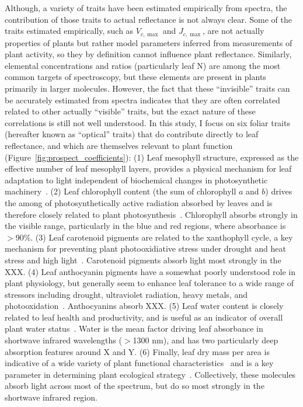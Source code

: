 Although, a variety of traits have been estimated empirically from spectra, the contribution of those traits to actual reflectance is not always clear.
Some of the traits estimated empirically, such as $V_{c,\max}$ and $J_{c,\max}$, are not actually properties of plants but rather model parameters inferred from measurements of plant activity, so they by definition cannot influence plant reflectance.
Similarly, elemental concentrations and ratios (particularly leaf N) are among the most common targets of spectroscopy, but these elements are present in plants primarily in larger molecules.
However, the fact that these ``invisible'' traits can be accurately estimated from spectra indicates that they are often correlated related to other actually ``visible'' traits, but the exact nature of these correlations is still not well understood.
In this study, I focus on six foliar traits (hereafter known as ``optical'' traits) that do contribute directly to leaf reflectance, and which are themselves relevant to plant function (Figure~\ref{fig:prospect_coefficients}):
(1) Leaf mesophyll structure, expressed as the effective number of leaf mesophyll layers, provides a physical mechanism for leaf adaptation to light independent of biochemical changes in photosynthetic machinery~\cite{ivanov_2016_photosynthesis,schollert_2017_leaf}.
(2) Leaf chlorophyll content (the sum of chlorophyll $a$ and $b$) drives the among of photosynthetically active radiation absorbed by leaves and is therefore closely related to plant photosynthesis~\cite{croft_2017_chlorophyll}.
Chlorophyll absorbs strongly in the visible range, particularly in the blue and red regions, where absorbance is $>$90\%.
(3) Leaf carotenoid pigments are related to the xanthophyll cycle, a key mechanism for preventing plant photooxidiative stress under drought and heat stress and high light~\cite{}. %
Carotenoid pigments absorb light most strongly in the XXX. %
(4) Leaf anthocyanin pigments have a somewhat poorly understood role in plant physiology, but generally seem to enhance leaf tolerance to a wide range of stressors including drought, ultraviolet radiation, heavy metals, and photooxidation~\cite{gould_2004_nature}.
Anthocyanins absorb XXX. %
(5) Leaf water content is closely related to leaf health and productivity, and is useful as an indicator of overall plant water status~\cite{penuelas_1994_reflectance,kramer_1995_water,cheng_2011_spectroscopic,chavana_bryant_2016_leaf}.
Water is the mean factor driving leaf absorbance in shortwave infrared wavelengths ($>$1300 nm), and has two particularly deep absorption features around X and Y. %
(6) Finally, leaf dry mass per area is indicative of a wide variety of plant functional characteristics~\cite{poorter_2009_causes} and is a key parameter in determining plant ecological strategy~\cite{wright_worldwide_2004,reich_world-wide_2014}. %
Collectively, these molecules absorb light across most of the spectrum, but do so most strongly in the shortwave infrared region.

